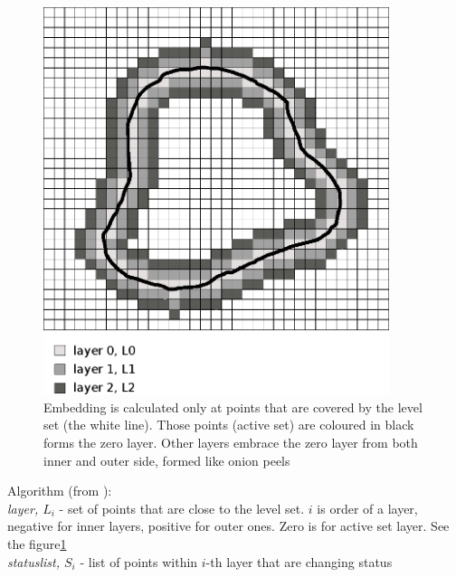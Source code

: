 \begin{figure}
    \centering
    \includegraphics[width=0.9\textwidth]{data/sparsefield}
    \caption[Sparse fields method computation illustration]{Embedding is calculated only at points that are covered by the level set (the white line). Those points (active set) are coloured in black forms the zero layer. Other layers embrace the zero layer from both inner and outer side, formed like onion peels}
    \label{fg:sparseFilelds}
\end{figure}

\par
Algorithm (from \cite{insightIntoImages}):\\
\label{alg:sparseFileld}
\emph{layer, $L_i$} - set of points that are close to the level set. $i$ is order of a layer, negative for inner layers, positive for outer ones. 
Zero is for active set layer. See the figure\ref{fg:sparseFilelds}\\
\emph{statuslist, $S_{i}$} - list of points within $i$-th layer that are changing status

